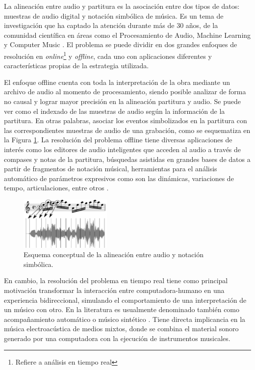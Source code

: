 \documentclass
  [ams,pdfout]%
	{aeslac}
\begin{document}
La alineación entre audio y partitura es la asociación entre dos tipos de datos: muestras de audio digital y notación simbólica de música. Es un tema de investigación que ha captado la atención durante más de 30 años, de la comunidad científica en áreas como el Procesamiento de Audio, Machine Learning y Computer Music \cite{orio2003score}. El problema se puede dividir en dos grandes enfoques de resolución en \textit{online}\footnote{Refiere a análisis en tiempo real} y \textit{offline}, cada uno con aplicaciones diferentes y características propias de la estrategia utilizada.

El enfoque offline cuenta con toda la interpretación de la obra mediante un archivo de audio al momento de procesamiento, siendo posible analizar de forma no causal y lograr mayor precisión en la alineación partitura y audio. Se puede ver como el indexado de las muestras de audio según la información de la partitura. En otras palabras, asociar los eventos simbolizados en la partitura con las correspondientes muestras de audio de una grabación, como se esquematiza en la Figura \ref{fig:resultado_alineacion}. La resolución del problema offline tiene diversas aplicaciones de interés como los editores de audio inteligentes que acceden al audio a través de compases y notas de la partitura, búsquedas asistidas en grandes bases de datos a partir de fragmentos de notación músical, herramientas para el análisis automático de parámetros expresivos como son las dinámicas, variaciones de tempo, articulaciones, entre otros \cite{dannenberg2006music}.

\begin{figure}[h!]
\begin{center}
\includegraphics[width=0.4\textwidth]{imagenes/resultado_alineacion} 
\caption{Esquema conceptual de la alineación entre audio y notación simbólica.}
\label{fig:resultado_alineacion}
\end{center}
\end{figure} 


En cambio, la resolución del problema en tiempo real tiene como principal motivación transformar la interacción entre computadora-humano en una experiencia bidireccional, simulando el comportamiento de una interpretación de un músico con otro. En la literatura es usualmente denominado también como acompañamiento automático o músico sintético \cite{vercoe1984synthetic}. Tiene directa implicancia en la música electroacústica de medios mixtos, donde se combina el material sonoro generado por una computadora con la ejecución de instrumentos musicales.
\end{document}
